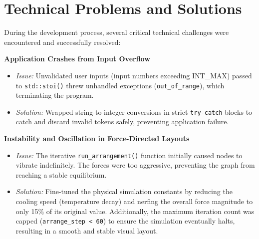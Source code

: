 \section{Technical Problems and Solutions}

During the development process, several critical technical challenges were encountered and successfully resolved:

\textbf{Application Crashes from Input Overflow}

\begin{itemize}
    \item \textit{Issue:} Unvalidated user inputs (input numbers exceeding INT\_MAX) passed to \texttt{std::stoi()} threw unhandled exceptions (\texttt{out\_of\_range}), which terminating the program.
    \item \textit{Solution:} Wrapped string-to-integer conversions in strict \texttt{try-catch} blocks to catch and discard invalid tokens safely, preventing application failure.
\end{itemize}

\textbf{Instability and Oscillation in Force-Directed Layouts}
\begin{itemize}
    \item \textit{Issue:} The iterative \texttt{run\_\allowbreak arrangement()} function initially caused nodes to vibrate indefinitely. The forces were too aggressive, preventing the graph from reaching a stable equilibrium.
    \item \textit{Solution:} Fine-tuned the physical simulation constants by reducing the cooling speed (temperature decay) and nerfing the overall force magnitude to only 15\% of its original value. Additionally, the maximum iteration count was capped (\texttt{arrange\_step < 60}) to ensure the simulation eventually halts, resulting in a smooth and stable visual layout.
\end{itemize}